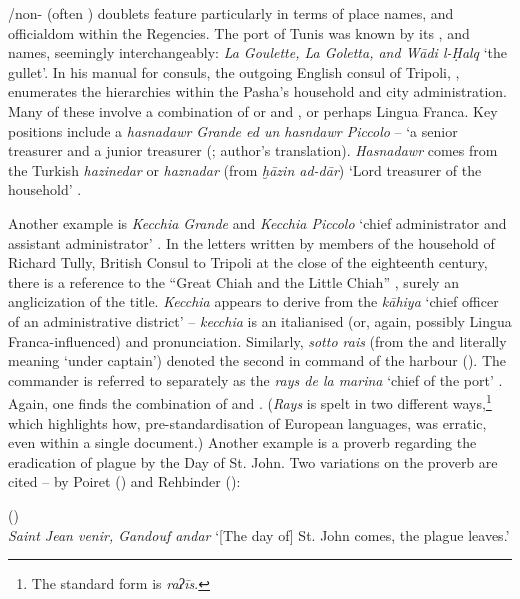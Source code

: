 \documentclass[output=paper]{langsci/langscibook}
\begin{document}
	/non- (often ) doublets feature particularly in terms of place names, and officialdom within the Regencies. The port of Tunis was known by its ,  and  names, seemingly interchangeably: \textit{La Goulette, La Goletta, and Wādi l-Ḥalq} ‘the gullet’. In his manual for  consuls, the outgoing English consul of Tripoli, , enumerates the hierarchies within the Pasha’s household and city administration. Many of these involve a combination of  or  and , or perhaps Lingua Franca. Key positions include a \textit{hasnadawr Grande ed un hasndawr Piccolo} – ‘a senior treasurer and a junior treasurer (\citealt[97]{Pennell1982}; author's translation).  \textit{Hasnadawr} comes from the  {Turkish} \textit{hazinedar} or \textit{haznadar} (from  \textit{ḫāzin ad-dār}) ‘Lord treasurer of the household’ \citep{Gilson1987}.
	
	Another example is \textit{Kecchia Grande} and \textit{Kecchia Piccolo} ‘chief administrator and assistant administrator’ \citep[104]{Pennell1982}. In the letters written by members of the household of Richard Tully, British Consul to Tripoli at the close of the eighteenth century, there is a reference to the ``Great Chiah and the Little Chiah'' \citep[70]{Tully1819}, surely an anglicization of the title. \textit{Kecchia} appears to derive from the   \textit{kāhiya} ‘chief officer of an administrative district’ – \textit{kecchia} is an italianised (or, again, possibly Lingua Franca-influenced)  and pronunciation. Similarly, \textit{sotto rais} (from the  and  literally meaning ‘under captain’) denoted the second in command of the harbour (\citealt[97, 100]{Pennell1982}). The commander is referred to separately as the \textit{rays de la marina} ‘chief of the port’ \citep[92]{Pennell1982}. Again, one finds the combination of  and . (\textit{Rays} is spelt in two different ways,\footnote{The standard  form is \textit{raʔīs}.} which highlights how, pre-standardisation of European languages,  was erratic, even within a single document.) Another example is a proverb regarding the eradication of plague by the Day of St. John. Two variations on the proverb are cited – by Poiret (\citeyear{Poiret1802}) and Rehbinder (\citeyear{Rehbinder1800}): 
	
	\ea
	(\citealt{Poiret1802})\\
	\textit{Saint Jean venir, Gandouf andar} 
	\glt ‘[The day of] St. John comes, the plague leaves.’
	\z
	
\end{document}
